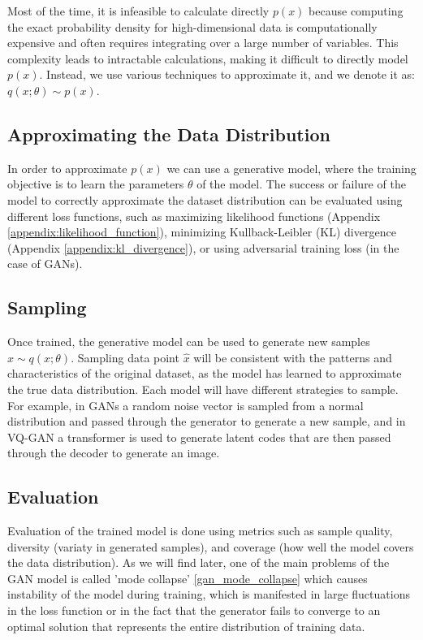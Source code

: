 Most of the time, it is infeasible to calculate directly $p(x)$ because computing the exact probability density for high-dimensional data is computationally expensive and often requires integrating over a large number of variables. This complexity leads to intractable calculations, making it difficult to directly model $p(x)$. Instead, we use various techniques to approximate it, and we denote it as: $q(x;\theta) \sim p(x)$.

\subsection{Approximating the Data Distribution}

In order to approximate $p(x)$ we can use a generative model, where the training objective is to learn the parameters $\theta$ of the model. The success or failure of the model to correctly approximate the dataset distribution can be evaluated using different loss functions, such as maximizing likelihood functions (Appendix \ref{appendix:likelihood_function}), minimizing Kullback-Leibler (KL) divergence (Appendix \ref{appendix:kl_divergence}), or using adversarial training loss (in the case of GANs).

\subsection{Sampling}

Once trained, the generative model can be used to generate new samples $\hat{x} \sim q(x;\theta)$. Sampling data point $\hat{x}$ will be consistent with the patterns and characteristics of the original dataset, as the model has learned to approximate the true data distribution. Each model will have different strategies to sample. For example, in GANs a random noise vector is sampled from a normal distribution and passed through the generator to generate a new sample, and in VQ-GAN a transformer is used to generate latent codes that are then passed through the decoder to generate an image.

\subsection{Evaluation}

Evaluation of the trained model is done using metrics such as sample quality, diversity (variaty in generated samples), and coverage (how well the model covers the data distribution). As we will find later, one of the main problems of the GAN model is called 'mode collapse' \ref{gan_mode_collapse} which causes instability of the model during training, which is manifested in large fluctuations in the loss function or in the fact that the generator fails to converge to an optimal solution that represents the entire distribution of training data.


